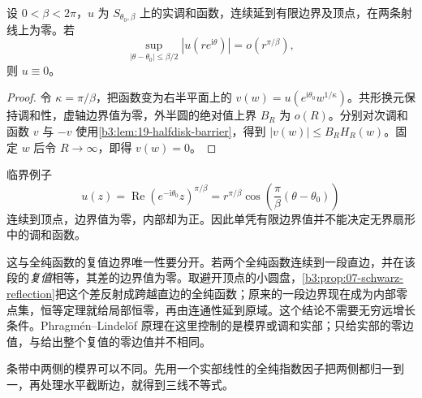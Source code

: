 \begin{proposition}[扇形调和函数的唯一性]\label{b3:prop:19-harmonic-uniqueness}
设 \(0<\beta<2\pi\)，\(u\) 为 \(S_{\theta_0,\beta}\) 上的实调和函数，连续延到有限边界及顶点，在两条射线上为零。若
\[
 \sup_{|\theta-\theta_0|\le\beta/2}|u(re^{\mathrm i\theta})|
 =o(r^{\pi/\beta}),
\]
则 \(u\equiv0\)。
\end{proposition}
\begin{proof}
令 \(\kappa=\pi/\beta\)，把函数变为右半平面上的
\(v(w)=u(e^{\mathrm i\theta_0}w^{1/\kappa})\)。共形换元保持调和性，虚轴边界值为零，外半圆的绝对值上界 \(B_R\) 为 \(o(R)\)。分别对次调和函数 \(v\) 与 \(-v\) 使用\cref{b3:lem:19-halfdisk-barrier}，得到
\( |v(w)|\le B_RH_R(w)\)。固定 \(w\) 后令 \(R\to\infty\)，即得 \(v(w)=0\)。
\end{proof}

临界例子
\[
 u(z)=\operatorname{Re}(e^{-\mathrm i\theta_0}z)^{\pi/\beta}
 =r^{\pi/\beta}\cos\left(\frac\pi\beta(\theta-\theta_0)\right)
\]
连续到顶点，边界值为零，内部却为正。因此单凭有限边界值并不能决定无界扇形中的调和函数。

\ProseParagraphBreak

这与全纯函数的复值边界唯一性要分开。若两个全纯函数连续到一段直边，并在该段的\emph{复值}相等，其差的边界值为零。取避开顶点的小圆盘，\cref{b3:prop:07-schwarz-reflection}把这个差反射成跨越直边的全纯函数；原来的一段边界现在成为内部零点集，恒等定理就给局部恒零，再由连通性延到原域。这个结论不需要无穷远增长条件。Phragmén--Lindelöf 原理在这里控制的是模界或调和实部；只给实部的零边值，与给出整个复值的零边值并不相同。

\ProseParagraphBreak

条带中两侧的模界可以不同。先用一个实部线性的全纯指数因子把两侧都归一到一，再处理水平截断边，就得到三线不等式。

